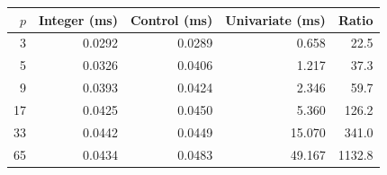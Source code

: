 \begin{tabular}{rrrrr}
\toprule
$p$ & Integer (ms) & Control (ms) & Univariate (ms) & Ratio\\
\midrule
3 & 0.0292 & 0.0289 & 0.658 & 22.5\\
5 & 0.0326 & 0.0406 & 1.217 & 37.3\\
9 & 0.0393 & 0.0424 & 2.346 & 59.7\\
17 & 0.0425 & 0.0450 & 5.360 & 126.2\\
33 & 0.0442 & 0.0449 & 15.070 & 341.0\\
65 & 0.0434 & 0.0483 & 49.167 & 1132.8\\
\bottomrule
\end{tabular}
